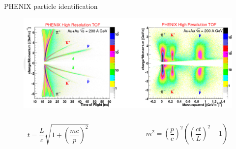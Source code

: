 \documentclass{beamer}
\begin{document}
\begin{frame}{PHENIX particle identification}
  \begin{figure}
    \includegraphics[width=\textwidth]{plots/PHENIX_PID.pdf}
  \end{figure}
  \begin{columns}
    \begin{column}{.5\textwidth}
      \begin{equation*}
        t=\frac{L}{c}\sqrt{1+\left( \frac{mc}{p} \right)^2}
      \end{equation*}
    \end{column}
    \begin{column}{.5\textwidth}
      \begin{equation*}
        m^2=\left( \frac{p}{c} \right)^2 \left( \left( \frac{ct}{L} \right)^2-1 \right)
      \end{equation*}
    \end{column}
  \end{columns}
\end{frame}
\end{document}
